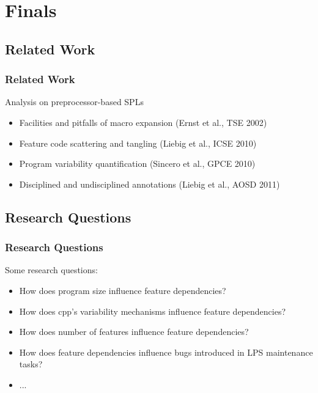 \section{Finals}

\subsection{Related Work}
\begin{frame}
	\frametitle{Related Work}
	Analysis on preprocessor-based SPLs
	\begin{itemize}
		\item Facilities and pitfalls of macro expansion (Ernst et al., TSE 2002)
		\item Feature code scattering and tangling (Liebig et al., ICSE 2010)
		\item Program variability quantification (Sincero et al., GPCE 2010)
		\item Disciplined and undisciplined annotations (Liebig et al., AOSD 2011)
	\end{itemize}
\end{frame}


\subsection{Research Questions}
\begin{frame}
	\frametitle{Research Questions}
	Some research questions:
	\begin{itemize}
		\item How does program size influence feature dependencies?
		\item How does cpp's variability mechanisms influence feature dependencies?
		\item How does number of features influence feature dependencies?
		\item How does feature dependencies influence bugs introduced in LPS maintenance tasks?
		\item ...
	\end{itemize}
\end{frame}

